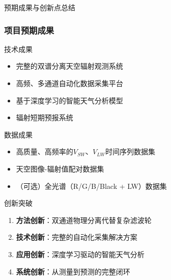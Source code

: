 \documentclass[aspectratio=169,11pt]{ctexbeamer}
\begin{document}
\begin{frame}{预期成果与创新点总结}
\frametitle{项目预期成果}
\begin{block}{技术成果}
\begin{itemize}
    \item 完整的双谱分离天空辐射观测系统
    \item 高频、多通道自动化数据采集平台
    \item 基于深度学习的智能天气分析模型
    \item 辐射短期预报系统
\end{itemize}
\end{block}

\begin{block}{数据成果}
\begin{itemize}
    \item 高质量、高频率的$V_{SW}$、$V_{LW}$时间序列数据集
    \item 天空图像-辐射值配对数据集
    \item （可选）全光谱（R/G/B/Black + LW）数据集
\end{itemize}
\end{block}

\begin{block}{创新突破}
\begin{enumerate}
    \item \textbf{方法创新}：双通道物理分离代替复杂滤波轮
    \item \textbf{技术创新}：完整的自动化采集解决方案
    \item \textbf{应用创新}：深度学习驱动的智能天气分析
    \item \textbf{系统创新}：从测量到预测的完整闭环
\end{enumerate}
\end{block}
\end{frame}
\end{document}
